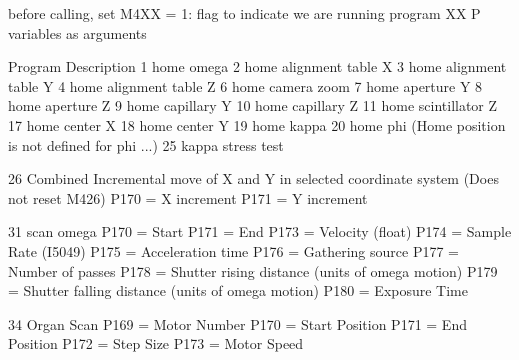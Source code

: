 \begin{DoxyPre}before calling, set
   M4XX = 1:  flag to indicate we are running program XX
   P variables as arguments\end{DoxyPre}



\begin{DoxyPre}Program         Description
  1             home omega
  2             home alignment table X
  3             home alignment table Y
  4             home alignment table Z
  6             home camera zoom
  7             home aperture Y
  8             home aperture Z
  9             home capillary Y
 10             home capillary Z
 11             home scintillator Z
 17             home center X
 18             home center Y
 19             home kappa
 20             home phi (Home position is not defined for phi ...)
 25             kappa stress test\end{DoxyPre}



\begin{DoxyPre} 26             Combined Incremental move of X and Y in selected coordinate system
                        (Does not reset M426)
                        P170  = X increment
                        P171  = Y increment\end{DoxyPre}



\begin{DoxyPre} 31             scan omega
                        P170  = Start
                        P171  = End
                        P173  = Velocity (float)
                        P174  = Sample Rate (I5049)
                        P175  = Acceleration time
                        P176  = Gathering source
                        P177  = Number of passes
                        P178  = Shutter rising distance (units of omega motion)
                        P179  = Shutter falling distance (units of omega motion)
                        P180  = Exposure Time\end{DoxyPre}



\begin{DoxyPre} 34             Organ Scan
                        P169  = Motor Number
                        P170  = Start Position
                        P171  = End Position
                        P172  = Step Size
                        P173  = Motor Speed\end{DoxyPre}



